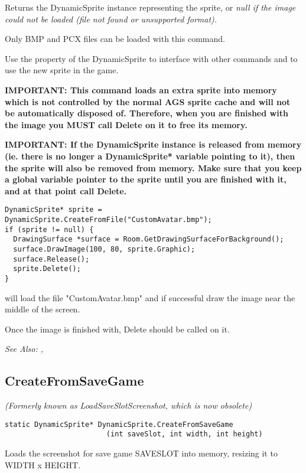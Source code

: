Returns the DynamicSprite instance representing the sprite, or \it{null} if the image
could not be loaded (file not found or unsupported format).

Only BMP and PCX files can be loaded with this command.

Use the  property of the DynamicSprite to
interface with other commands and to use the new sprite in the game.

\bf{IMPORTANT:} This command loads an extra sprite into memory which is not controlled
by the normal AGS sprite cache and will not be automatically disposed of. Therefore, when
you are finished with the image you \bf{MUST} call Delete on it to free its memory.

\bf{IMPORTANT:} If the DynamicSprite instance is released from memory (ie. there is
no longer a DynamicSprite* variable pointing to it), then the sprite will also be
removed from memory. Make sure that you keep a global variable pointer to the sprite
until you are finished with it, and at that point call Delete.

\begin{verbatim}
DynamicSprite* sprite = DynamicSprite.CreateFromFile("CustomAvatar.bmp");
if (sprite != null) {
  DrawingSurface *surface = Room.GetDrawingSurfaceForBackground();
  surface.DrawImage(100, 80, sprite.Graphic);
  surface.Release();
  sprite.Delete();
}
\end{verbatim}
will load the file "CustomAvatar.bmp" and if successful draw the image near the middle
of the screen.

Once the image is finished with, Delete should be called on it.

\it{See Also:} ,


\subsection{CreateFromSaveGame}\label{DynamicSprite.CreateFromSaveGame}%

\it{(Formerly known as LoadSaveSlotScreenshot, which is now obsolete)}

\begin{verbatim}
static DynamicSprite* DynamicSprite.CreateFromSaveGame
                        (int saveSlot, int width, int height)
\end{verbatim}
Loads the screenshot for save game SAVESLOT into memory, resizing it to WIDTH x HEIGHT.

